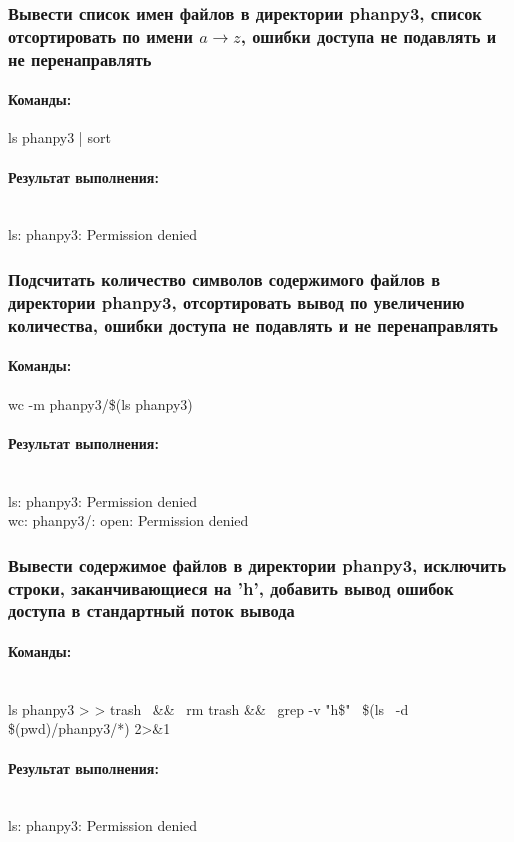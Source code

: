 \documentclass[12pt,onecolumn]{article}
\begin{document}
\subsubsection{Вывести список имен файлов в директории phanpy3, список отсортировать по имени $a \rightarrow z$, ошибки доступа не подавлять и не перенаправлять}
\paragraph{Команды:}
ls phanpy3 | sort
\paragraph{Результат выполнения: }
\hfill\\
ls: phanpy3: Permission denied
\subsubsection{Подсчитать количество символов содержимого файлов в директории phanpy3, отсортировать вывод по увеличению количества, ошибки доступа не подавлять и не перенаправлять}
\paragraph{Команды:}
wc -m phanpy3/\$(ls phanpy3)
\paragraph{Результат выполнения: }
\hfill\\
ls: phanpy3: Permission denied\\
wc: phanpy3/: open: Permission denied\\
\subsubsection{Вывести содержимое файлов в директории phanpy3, исключить строки, заканчивающиеся на 'h', добавить вывод ошибок доступа в стандартный поток вывода}
\paragraph{Команды:}
\hfill\\
ls phanpy3 > > trash~ \&\&~ rm trash \&\&~ grep -v  "h\$" \, \$(ls~ -d \$(pwd)/phanpy3/*) 2>\&1
\paragraph{Результат выполнения: }
\hfill\\
ls: phanpy3: Permission denied
\end{document}
